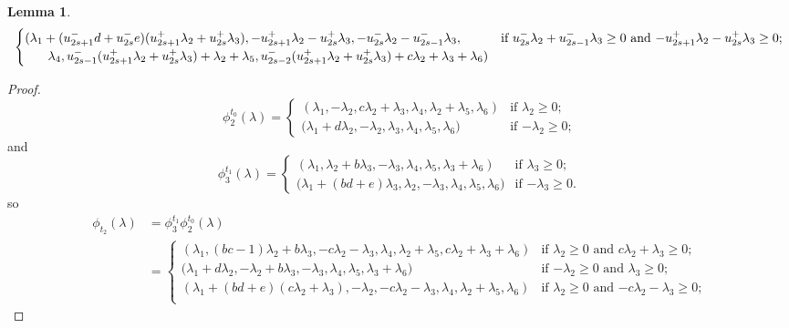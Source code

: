 \documentclass{amsart}
\newtheorem{lemma}[theorem]{Lemma}
\numberwithin{theorem}{section}
\begin{document}
\begin{landscape}
\begin{lemma}
\begin{align*}
\begin{cases}
        (\lambda_1+(u_{2s+1}^-d+u_{2s}^-e)(u_{2s+1}^+\lambda_2+u_{2s}^+\lambda_3),-u_{2s+1}^+\lambda_2-u_{2s}^+\lambda_3,-u_{2s}^-\lambda_2-u_{2s-1}^-\lambda_3, & \text{if $u_{2s}^-\lambda_2+u_{2s-1}^-\lambda_3 \ge 0$ and $-u_{2s+1}^+\lambda_2-u_{2s}^+\lambda_3 \ge 0$;}\\
        \hspace{0.25in} \lambda_4,u_{2s-1}^-(u_{2s+1}^+\lambda_2+u_{2s}^+\lambda_3)+\lambda_2+\lambda_5,u_{2s-2}^-(u_{2s+1}^+\lambda_2+u_{2s}^+\lambda_3)+c\lambda_2+\lambda_3+\lambda_6) & \\
      \end{cases}
    \end{align*}
  \end{lemma}
  \begin{proof}
    \[
      \phi^{t_0}_2(\lambda)
      =
      \begin{cases} 
        (\lambda_1,-\lambda_2,c\lambda_2+\lambda_3,\lambda_4,\lambda_2+\lambda_5,\lambda_6) & \text{if $\lambda_2 \ge 0$;}\\
        \big(\lambda_1+d\lambda_2,-\lambda_2,\lambda_3,\lambda_4,\lambda_5,\lambda_6\big) & \text{if $-\lambda_2 \ge 0$;}
      \end{cases}
    \]
    and
    \[
      \phi^{t_1}_3(\lambda)
      =
      \begin{cases} 
        (\lambda_1,\lambda_2+b\lambda_3,-\lambda_3,\lambda_4,\lambda_5,\lambda_3+\lambda_6) & \text{if $\lambda_3 \ge 0$;}\\
        \big(\lambda_1+(bd+e)\lambda_3,\lambda_2,-\lambda_3,\lambda_4,\lambda_5,\lambda_6\big) & \text{if $-\lambda_3 \ge 0$.}
      \end{cases}
    \]
    so
    \begin{align*}
      \phi_{t_2}(\lambda)
      &=\phi^{t_1}_3\phi^{t_0}_2(\lambda)\\
      &=
      \begin{cases} 
        (\lambda_1,(bc-1)\lambda_2+b\lambda_3,-c\lambda_2-\lambda_3,\lambda_4,\lambda_2+\lambda_5,c\lambda_2+\lambda_3+\lambda_6) & \text{if $\lambda_2 \ge 0$ and $c\lambda_2+\lambda_3 \ge 0$;}\\
        \big(\lambda_1+d\lambda_2,-\lambda_2+b\lambda_3,-\lambda_3,\lambda_4,\lambda_5,\lambda_3+\lambda_6\big) & \text{if $-\lambda_2 \ge 0$ and $\lambda_3 \ge 0$;}\\
        \hline
        (\lambda_1+(bd+e)(c\lambda_2+\lambda_3),-\lambda_2,-c\lambda_2-\lambda_3,\lambda_4,\lambda_2+\lambda_5,\lambda_6) & \text{if $\lambda_2 \ge 0$ and $-c\lambda_2-\lambda_3 \ge 0$;}\\

\end{cases}
\end{align*}
\end{proof}
\end{landscape}
\end{document}
